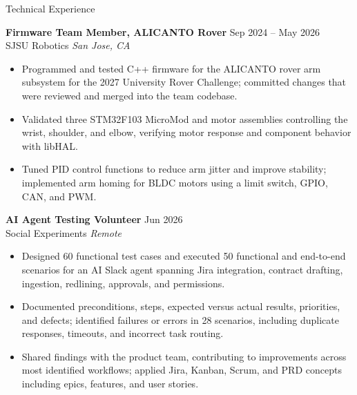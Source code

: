 \documentclass{resume}
\begin{document}
\begin{rSection}{Technical Experience}

\textbf{Firmware Team Member, ALICANTO Rover} \hfill Sep 2024 -- May 2026\\
SJSU Robotics \hfill \textit{San Jose, CA}
\begin{itemize}
    \itemsep -3pt {}
    \item Programmed and tested C++ firmware for the ALICANTO rover arm subsystem for the 2027 University Rover Challenge; committed changes that were reviewed and merged into the team codebase.
    \item Validated three STM32F103 MicroMod and motor assemblies controlling the wrist, shoulder, and elbow, verifying motor response and component behavior with libHAL.
    \item Tuned PID control functions to reduce arm jitter and improve stability; implemented arm homing for BLDC motors using a limit switch, GPIO, CAN, and PWM.
\end{itemize}

\textbf{AI Agent Testing Volunteer} \hfill Jun 2026\\
Social Experiments \hfill \textit{Remote}
\begin{itemize}
    \itemsep -3pt {}
    \item Designed 60 functional test cases and executed 50 functional and end-to-end scenarios for an AI Slack agent spanning Jira integration, contract drafting, ingestion, redlining, approvals, and permissions.
    \item Documented preconditions, steps, expected versus actual results, priorities, and defects; identified failures or errors in 28 scenarios, including duplicate responses, timeouts, and incorrect task routing.
    \item Shared findings with the product team, contributing to improvements across most identified workflows; applied Jira, Kanban, Scrum, and PRD concepts including epics, features, and user stories.
\end{itemize}

\end{rSection}
\end{document}
